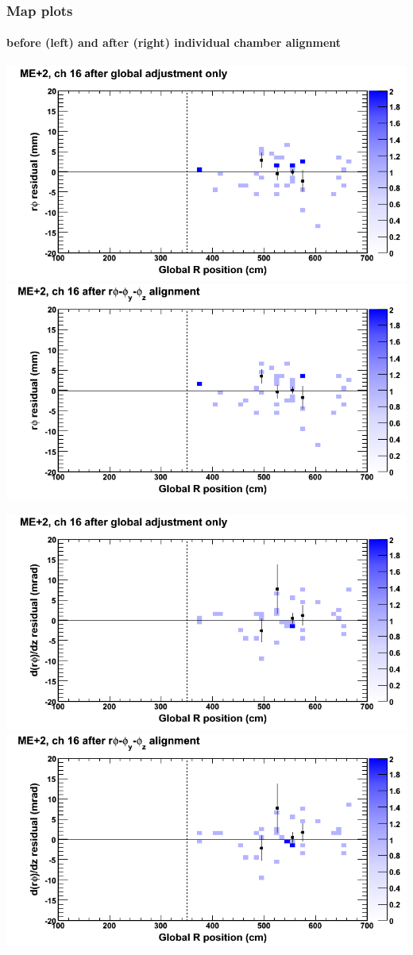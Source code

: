 \documentclass[compress]{beamer}
\begin{document}
\begin{frame}
\frametitle{Map plots}
\framesubtitle{before (left) and after (right) individual chamber alignment}
\includegraphics[width=0.5\linewidth]{ringmapplots_3dof/before_CSCvsr_mep2ch16_x.png} \includegraphics[width=0.5\linewidth]{ringmapplots_3dof/after_CSCvsr_mep2ch16_x.png}

\includegraphics[width=0.5\linewidth]{ringmapplots_3dof/before_CSCvsr_mep2ch16_dxdz.png} \includegraphics[width=0.5\linewidth]{ringmapplots_3dof/after_CSCvsr_mep2ch16_dxdz.png}
\end{frame}
\end{document}
